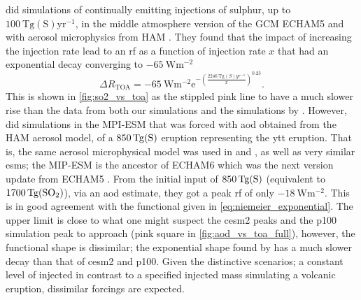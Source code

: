 \documentclass{ametsocV5}
\newcommand{\iso}[1][i]{{#1}njected \ce{SO2}}
\begin{document}
\citet{niemeier2015} did simulations of continually emitting injections of sulphur, up
to \(\SI{100}{\tera\gram \mathrm{(S)}\mathrm{yr}^{-1}}\), in the middle atmosphere
version of the GCM ECHAM5 \citep{giorgetta2006} and with aerosol microphysics from HAM
\citep{stier2005}. They found that the impact of increasing the injection rate lead to
an \ac{rf} as a function of injection rate \(x\) that had an exponential decay
converging to \(\SI{-65}{\watt\meter^{-2}}\)
\begin{equation}
  \Delta
  R_{\mathrm{TOA}} =
  -\SI{65}{\watt\metre^{-2}}
  \mathrm{e}^{-{\left(\frac{\SI{2246}{\tera\gram(S)yr^{-1}}}{x}\right)}^{0.23}}.
  \label{eq:niemeier_exponential}
\end{equation}
%
This is shown in \cref{fig:so2_vs_toa} as the stippled pink line to have a much slower
rise than the data from both our simulations and the simulations by
\citet{ottobliesner2016}. However, \citet{timmreck2010} did simulations in the MPI-ESM
that was forced with \ac{aod} obtained from the HAM aerosol model, of a
\(\SI{850}{\tera\gram(\ce{S})}\) eruption representing the \ac{ytt} eruption. That is,
the same aerosol microphysical model was used in \citet{timmreck2010} and
\citet{niemeier2015}, as well as very similar \acp{esm}; the MIP-ESM is the ancestor of
ECHAM6 which was the next version update from ECHAM5 \citep{kuma23}. From the initial
input of \(\SI{850}{\tera\gram(\ce{S})}\) (equivalent to
\(\SI{1700}{\tera\gram(\ce{SO2})}\)), via an \ac{aod} estimate, they got a peak \ac{rf}
of only \(\SI{-18}{\watt\metre^{-2}}\). This is in good agreement with the functional
given in \cref{eq:niemeier_exponential}. The upper limit is close to what one might
suspect the \ac{cesm2} peaks and the \ac{p100} simulation peak to approach (pink square
in \cref{fig:aod_vs_toa_full}), however, the functional shape is dissimilar; the
exponential shape found by \citet{niemeier2015} has a much slower decay than that of
\ac{cesm2} and \ac{p100}. Given the distinctive scenarios; a constant level of \iso{} in
contrast to a specified injected mass simulating a volcanic eruption, dissimilar
forcings are expected.

\end{document}
